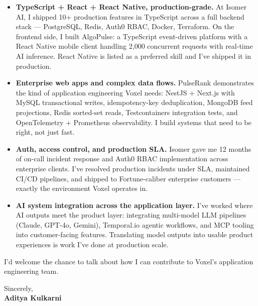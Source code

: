 \documentclass[11pt]{article}
\begin{document}
\begin{itemize}[leftmargin=1.2em, itemsep=4pt]
  \item[\textcolor{VoxelBlue}{\faAngleRight}] \textbf{TypeScript + React + React Native, production-grade.} At Isomer AI, I shipped 10+ production features in TypeScript across a full backend stack — PostgreSQL, Redis, Auth0 RBAC, Docker, Terraform. On the frontend side, I built AlgoPulse: a TypeScript event-driven platform with a React Native mobile client handling 2,000 concurrent requests with real-time AI inference. React Native is listed as a preferred skill and I've shipped it in production.
  \item[\textcolor{VoxelBlue}{\faAngleRight}] \textbf{Enterprise web apps and complex data flows.} PulseRank demonstrates the kind of application engineering Voxel needs: NestJS + Next.js with MySQL transactional writes, idempotency-key deduplication, MongoDB feed projections, Redis sorted-set reads, Testcontainers integration tests, and OpenTelemetry + Prometheus observability. I build systems that need to be right, not just fast.
  \item[\textcolor{VoxelBlue}{\faAngleRight}] \textbf{Auth, access control, and production SLA.} Isomer gave me 12 months of on-call incident response and Auth0 RBAC implementation across enterprise clients. I've resolved production incidents under SLA, maintained CI/CD pipelines, and shipped to Fortune-caliber enterprise customers — exactly the environment Voxel operates in.
  \item[\textcolor{VoxelBlue}{\faAngleRight}] \textbf{AI system integration across the application layer.} I've worked where AI outputs meet the product layer: integrating multi-model LLM pipelines (Claude, GPT-4o, Gemini), Temporal.io agentic workflows, and MCP tooling into customer-facing features. Translating model outputs into usable product experiences is work I've done at production scale.
\end{itemize}

\vspace{8pt}

I'd welcome the chance to talk about how I can contribute to Voxel's application engineering team.

\vspace{10pt}

Sincerely, \\[4pt]
\textbf{Aditya Kulkarni}
\end{document}
